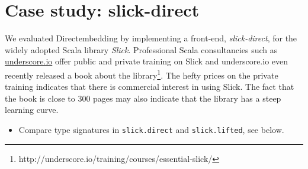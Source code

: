 \section{Case study: slick-direct} %
\label{sec:CaseStudy}
We evaluated Directembedding by implementing a front-end, \emph{slick-direct}, for the widely adopted Scala library \emph{Slick}.
Professional Scala consultancies such as \href{http://underscore.io}{underscore.io} offer public and private training on Slick and underscore.io even recently released a book about the library\footnote{http://underscore.io/training/courses/essential-slick/}.
The hefty prices on the private training indicates that there is commercial interest in using Slick.
The fact that the book is close to 300 pages may also indicate that the library has a steep learning curve.


\begin{itemize}
    \item Compare type signatures in \texttt{slick.direct} and \texttt{slick.lifted}, see below.
\end{itemize}




